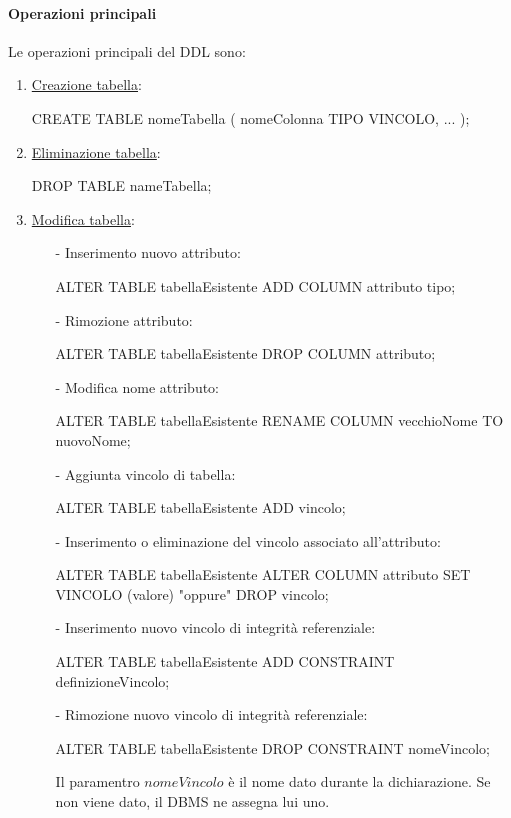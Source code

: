 \documentclass[a4paper, 10pt]{report}
\begin{document}
\paragraph{Operazioni principali} Le operazioni principali del DDL sono:
\begin{enumerate}
\item \underline{Creazione tabella}:
\begin{code}
	CREATE TABLE nomeTabella (
    		nomeColonna TIPO VINCOLO,
    		...    		
	);
\end{code}

\item \underline{Eliminazione tabella}:
\begin{code}
	DROP TABLE nameTabella;
\end{code}

\item \underline{Modifica tabella}:
\begin{itemize}
\item[-] Inserimento nuovo attributo:
\begin{code}
	ALTER TABLE tabellaEsistente ADD COLUMN attributo tipo;
\end{code}

\item[-] Rimozione attributo:
\begin{code}
	ALTER TABLE tabellaEsistente DROP COLUMN attributo; 
\end{code}

\item[-] Modifica nome attributo:
\begin{code}
	ALTER TABLE tabellaEsistente RENAME COLUMN vecchioNome TO nuovoNome; 
\end{code}

\item[-] Aggiunta vincolo di tabella:
\begin{code}
	ALTER TABLE tabellaEsistente ADD vincolo; 
\end{code}

\item[-] Inserimento o eliminazione del vincolo associato all'attributo:
\begin{code}
	ALTER TABLE tabellaEsistente ALTER COLUMN attributo
		SET VINCOLO (valore) "oppure" DROP vincolo;
\end{code}

\item[-] Inserimento nuovo vincolo di integrità referenziale:
\begin{code}
	ALTER TABLE tabellaEsistente ADD CONSTRAINT definizioneVincolo;
\end{code}

\item[-] Rimozione nuovo vincolo di integrità referenziale:
\begin{code}
	ALTER TABLE tabellaEsistente DROP CONSTRAINT nomeVincolo;
\end{code}

\noindent Il paramentro $nomeVincolo$ è il nome dato durante la dichiarazione. Se non viene dato, il DBMS ne assegna lui uno.
\end{itemize}
\end{enumerate}
\end{document}
